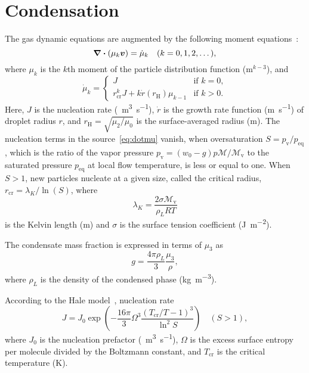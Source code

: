 \documentclass{article}
\newcommand{\vap}{\text{v}}
\newcommand{\eq}{\text{eq}}
\newcommand{\crit}[2][]{#2_\text{cr#1}}
\newcommand{\Hill}{\text{H}}
\newcommand{\bv}{\vb*{v}}
\begin{document}
\section{Condensation}

The gas dynamic equations are augmented by the following moment equations~\cite{hill1966condensation}:
\begin{equation}\label{eq:mu_k}
    \div(\mu_k\bv) = \dot{\mu}_k \quad (k=0,1,2,\dots),
\end{equation}
where $\mu_k$ is the $k$th moment of the particle distribution function ($\si{\m}^{k-3}$), and
\begin{equation}\label{eq:dotmu}
    \dot\mu_k = \begin{cases}
        J &\text{if } k=0,\\
        \crit{r}^{k}J + k\dot{r}(r_\Hill)\mu_{k-1} &\text{if } k>0.
    \end{cases}
\end{equation}
Here, $J$ is the nucleation rate (\si{\per\cubic\m\per\s}),
$\dot{r}$ is the growth rate function (\si{\m\per\s}) of droplet radius $r$,
and $r_\Hill=\sqrt{\mu_2/\mu_0}$ is the surface-averaged radius (\si{\m}).
The nucleation terms in the source~\eqref{eq:dotmu} vanish, when oversaturation $S = p_\vap/p_\eq$,
which is the ratio of the vapor pressure $p_\vap = (w_0 - g)p\mathcal{M}/\mathcal{M}_\vap$
to the saturated pressure $p_\eq$ at local flow temperature, is less or equal to one.
When $S>1$, new particles nucleate at a given size,
called the critical radius, $\crit{r} = \lambda_K/\ln(S)$, where
\begin{equation}\label{eq:Kelvin}
    \lambda_K = \frac{2\sigma \mathcal{M}_\vap}{\rho_L R T}
\end{equation}
is the Kelvin length (\si{m}) and $\sigma$ is the surface tension coefficient (\si{\J\per\square\m}).

The condensate mass fraction is expressed in terms of $\mu_3$ as
\begin{equation}\label{eq:g}
     g = \frac{4\pi\rho_L}{3} \frac{\mu_3}{\rho},
\end{equation}
where $\rho_L$ is the density of the condensed phase (\si{\kg\per\cubic\m}).

According to the Hale model~\cite{hale2004scaling}, nucleation rate
\begin{equation}\label{eq:J}
    J = J_0\exp(-\frac{16\pi}{3}\Omega^3\frac{(\crit{T}/T-1)^3}{\ln^2{S}}) \quad (S > 1),
\end{equation}
where $J_0$ is the nucleation prefactor (\si{\per\cubic\m\per\s}),
$\Omega$ is the excess surface entropy per molecule divided by the Boltzmann constant,
and $\crit{T}$ is the critical temperature (\si{\K}).
\end{document}

